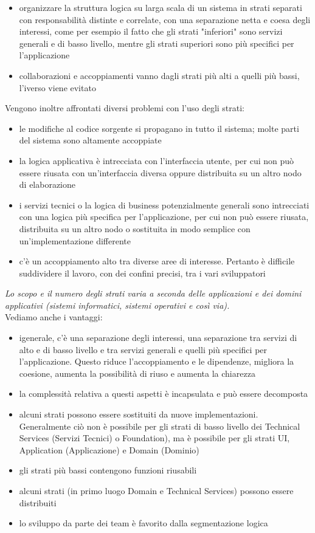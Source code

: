 \documentclass[a4paper,12pt, oneside]{book}
\begin{document}
\begin{itemize}
\item organizzare la struttura logica su larga scala di un sistema in strati separati con
responsabilità distinte e correlate, con una separazione netta e coesa degli interessi,
come per esempio il fatto che gli strati "inferiori" sono servizi generali e di basso
livello, mentre gli strati superiori sono più specifici per l'applicazione
\item collaborazioni e accoppiamenti vanno dagli strati più alti a quelli più bassi, l'iverso viene evitato
\end{itemize}
Vengono inoltre affrontati diversi problemi con l'uso degli strati:
\begin{itemize}
\item le modifiche al codice sorgente si propagano in tutto il sistema; molte parti del
  sistema sono altamente accoppiate
\item la logica applicativa è intrecciata con l'interfaccia utente, per cui non può essere
  riusata con un'interfaccia diversa oppure distribuita su un altro nodo di elaborazione
\item i servizi tecnici o la logica di business potenzialmente generali sono intrecciati
con una logica più specifica per l'applicazione, per cui non può essere riusata, distribuita su un altro nodo o sostituita in modo semplice con un'implementazione
differente
\item c'è un accoppiamento alto tra diverse aree di interesse. Pertanto è difficile suddividere il lavoro, con dei confini precisi, tra i vari sviluppatori
\end{itemize}
\textit{Lo scopo e il numero degli strati varia a seconda delle applicazioni e dei domini applicativi (sistemi informatici, sistemi operativi e così via).}\\
Vediamo anche i vantaggi:
\begin{itemize}
\item igenerale, c'è una separazione degli interessi, una separazione tra servizi di alto e
di basso livello e tra servizi generali e quelli più specifici per l'applicazione. Questo
riduce l'accoppiamento e le dipendenze, migliora la coesione, aumenta la possibilità di riuso e aumenta la chiarezza
\item la complessità relativa a questi aspetti è incapsulata e può essere decomposta
\item alcuni strati possono essere sostituiti da nuove implementazioni. Generalmente ciò
non è possibile per gli strati di basso livello dei Technical Services (Servizi Tecnici)
o Foundation), ma è possibile per gli strati UI, Application
(Applicazione) e Domain (Dominio)
\item gli strati più bassi contengono funzioni riusabili
\item alcuni strati (in primo luogo Domain e Technical Services) possono essere distribuiti
\item lo sviluppo da parte dei team è favorito dalla segmentazione logica
\end{itemize}
\end{document}
